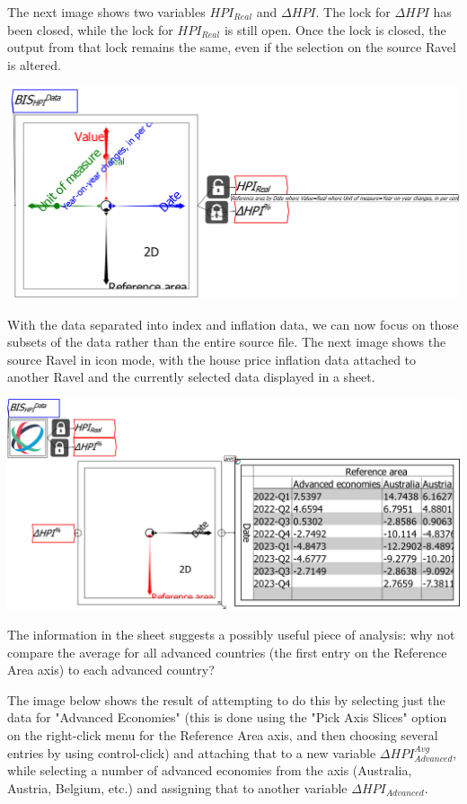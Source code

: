 The next image shows two variables $HPI_{Real}$ and $\Delta{HPI}$.
The lock for $\Delta{HPI}$ has been closed, while the lock for $HPI_{Real}$
is still open. Once the lock is closed, the output from that lock
remains the same, even if the selection on the source Ravel is altered.

\includegraphics[width=15cm]{images/tut05HPIandInflationSeparatedLocks}

With the data separated into index and inflation data, we can now
focus on those subsets of the data rather than the entire source file.
The next image shows the source Ravel in icon mode, with the house
price inflation data attached to another Ravel and the currently selected
data displayed in a sheet.

\includegraphics[width=15cm]{images/tut06HPIwithVariablesAssigned02DeltaHPI}

The information in the sheet suggests a possibly useful piece of analysis:
why not compare the average for all advanced countries (the first
entry on the Reference Area axis) to each advanced country?

The image below shows the result of attempting to do this by selecting
just the data for "Advanced Economies" (this is done using the "Pick
Axis Slices" option on the right-click menu for the Reference Area
axis, and then choosing several entries by using control-click) and
attaching that to a new variable $\Delta{HPI}_{Advanced}^{Avg}$,
while selecting a number of advanced economies from the axis (Australia,
Austria, Belgium, etc.) and assigning that to another variable $\Delta{HPI}_{Advanced}$.

